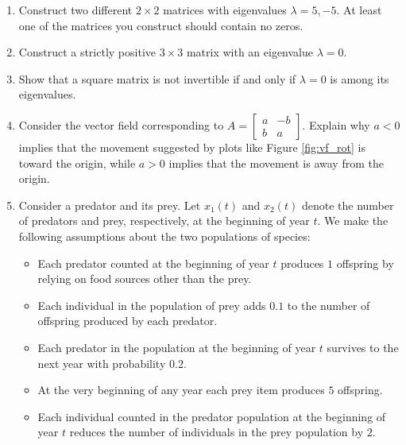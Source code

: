 \documentclass[11pt]{article}
\begin{document}
\begin{enumerate}
\begin{enumerate}
\[\begin{bmatrix}
          \end{bmatrix}
          \quad
          \text{(j)}\
          \begin{bmatrix}
            -1&0&2\\ 
            1&-2&1\\ 
            2&0&3
          \end{bmatrix} \quad
          \text{{\it Hint for (j): }one eigenvalue is,}\ -2
        \]
      \item Construct two different $2\times 2$ matrices with eigenvalues $\lambda=5,-5$. At least one of the matrices you construct should contain no zeros.
      \item Construct a strictly positive $3\times 3$ matrix with an eigenvalue $\lambda=0$. 
      \item Show that a square matrix is not invertible if and only if $\lambda=0$ is among its eigenvalues.
      \item Consider the vector field corresponding to $A=\begin{bmatrix} a & -b \\ b & a \end{bmatrix}$. Explain why $a<0$ implies that the movement suggested by plots like Figure \ref{fig:vf_rot} is toward the origin, while $a>0$ implies that the movement is away from the origin.
      \item Consider a predator and its prey. Let $x_1(t)$ and $x_2(t)$ denote the number of predators and prey, respectively, at the beginning of year $t$. We make the following assumptions about the two populations of species:
        \begin{itemize}
          \item Each predator counted at the beginning of year $t$ produces $1$ offspring by relying on food sources other than the prey.
          \item Each individual in the population of prey adds $0.1$ to the number of offspring produced by each predator. 
          \item Each predator in the population at the beginning of year $t$ survives to the next year with probability $0.2$.
          \item At the very beginning of any year each prey item produces $5$ offspring. 
          \item Each individual counted in the predator population at the beginning of year $t$ reduces the number of individuals in the prey population by $2$.
        \end{itemize}

\end{enumerate}
\end{enumerate}
\end{document}
